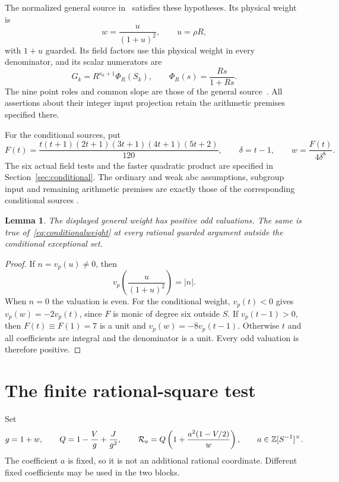 \documentclass[11pt,a4paper]{article}
\newtheorem{lemma}[theorem]{Lemma}
\begin{document}
The normalized general source in~\cite{Normalized} satisfies these
hypotheses. Its physical weight is
\[
             w=\frac{u}{(1+u)^2},\qquad u=\rho R,
\]
with $1+u$ guarded. Its field factors use this physical weight in
every denominator, and its scalar numerators are
\[
 G_k=R^{\kappa_k+1}\Phi_R(S_k),\qquad
 \Phi_R(s)=\frac{Rs}{1+Rs}.
\]
The nine point roles and common slope are those of the general
source~\cite{General,Unit}. All assertions about their integer input
projection retain the arithmetic premises specified there.

For the conditional sources, put
\begin{equation}\label{eq:conditionalweight}
 F(t)=\frac{t(t+1)(2t+1)(3t+1)(4t+1)(5t+2)}{120},\qquad
 \delta=t-1,\qquad w=\frac{F(t)}{4\delta^8}.
\end{equation}
The six actual field tests and the faster quadratic product are
specified in Section~\ref{sec:conditional}. The ordinary and weak
abc assumptions, subgroup input and remaining arithmetic premises
are exactly those of the corresponding conditional sources
\cite{Conditional,Normalized}.

\begin{lemma}\label{lem:weight}
The displayed general weight has positive odd valuations. The same
is true of~\eqref{eq:conditionalweight} at every rational guarded
argument outside the conditional exceptional set.
\end{lemma}
\begin{proof}
If $n=v_p(u)\ne0$, then
\[
 v_p\left(\frac{u}{(1+u)^2}\right)=|n|.
\]
When $n=0$ the valuation is even. For the conditional weight,
$v_p(t)<0$ gives $v_p(w)=-2v_p(t)$, since $F$ is monic of degree
six outside $S$. If $v_p(t-1)>0$, then $F(t)\equiv F(1)=7$ is a
unit and $v_p(w)=-8v_p(t-1)$. Otherwise $t$ and all coefficients
are integral and the denominator is a unit. Every odd valuation is
therefore positive.
\end{proof}

\section{The finite rational-square test}

Set
\begin{equation}\label{eq:criterion}
 g=1+w,\qquad Q=1-\frac Vg+\frac J{g^2},\qquad
 \mathcal R_a=Q\left(1+\frac{a^2(1-V/2)}w\right),
 \qquad a\in\mathbb Z[S^{-1}]^\times.
\end{equation}
The coefficient $a$ is fixed, so it is not an additional rational
coordinate. Different fixed coefficients may be used in the two blocks.
\end{document}
